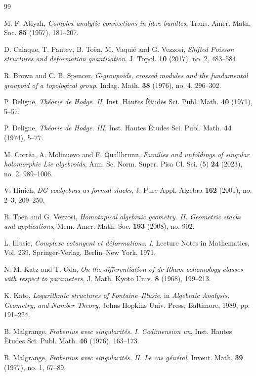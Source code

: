 \documentclass[11pt,reqno,a4paper,dvipsnames,x11names]{amsart}
\numberwithin{equation}{section}
\theoremstyle{plain}
\theoremstyle{definition}
\theoremstyle{remark}
\begin{document}
\begin{thebibliography}{99}

M. F. Atiyah,
\emph{Complex analytic connections in fibre bundles},
Trans. Amer. Math. Soc. \textbf{85} (1957), 181--207.

D. Calaque, T. Pantev, B. To\"en, M. Vaqui\'e and G. Vezzosi,
\emph{Shifted Poisson structures and deformation quantization},
J. Topol. \textbf{10} (2017), no. 2, 483--584.


R. Brown and C. B. Spencer,
\emph{G-groupoids, crossed modules and the fundamental groupoid of a topological group},
Indag. Math. \textbf{38} (1976), no. 4, 296--302.

P. Deligne,
\emph{Th\'eorie de Hodge. II},
Inst. Hautes \`Etudes Sci. Publ. Math. \textbf{40} (1971), 5--57.

P. Deligne,
\emph{Th\'eorie de Hodge. III},
Inst. Hautes \`Etudes Sci. Publ. Math. \textbf{44} (1974), 5--77.

M. Corr\^ea, A. Molinuevo and F. Quallbrunn,
\emph{Families and unfoldings of singular holomorphic Lie algebroids},
Ann. Sc. Norm. Super. Pisa Cl. Sci. (5) \textbf{24} (2023), no. 2, 989--1006.

V. Hinich,
\emph{DG coalgebras as formal stacks},
J. Pure Appl. Algebra \textbf{162} (2001), no. 2--3, 209--250.

B. To\"en and G. Vezzosi,
\emph{Homotopical algebraic geometry. II. Geometric stacks and applications},
Mem. Amer. Math. Soc. \textbf{193} (2008), no. 902.

L. Illusie,
\emph{Complexe cotangent et d\'eformations. I},
Lecture Notes in Mathematics, Vol. 239, Springer-Verlag, Berlin--New York, 1971.

N. M. Katz and T. Oda,
\emph{On the differentiation of de Rham cohomology classes with respect to parameters},
J. Math. Kyoto Univ. \textbf{8} (1968), 199--213.

K. Kato,
\emph{Logarithmic structures of Fontaine--Illusie},
in \emph{Algebraic Analysis, Geometry, and Number Theory},
Johns Hopkins Univ. Press, Baltimore, 1989, pp. 191--224.

B. Malgrange,
\emph{Frobenius avec singularit\'es. I. Codimension un},
Inst. Hautes \`Etudes Sci. Publ. Math. \textbf{46} (1976), 163--173.

B. Malgrange,
\emph{Frobenius avec singularit\'es. II. Le cas g\'en\'eral},
Invent. Math. \textbf{39} (1977), no. 1, 67--89.


\end{thebibliography}
\end{document}
